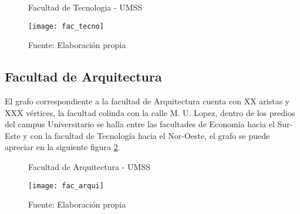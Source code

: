 \begin{figure}[H]
  \begin{center}
    \caption{Facultad de Tecnologia - UMSS}
    \label{fig:fac_tecno}
    \texttt{[image: fac\_tecno]}
    \caption*{Fuente: Elaboración propia}
  \end{center}
\end{figure}

\subsection{Facultad de Arquitectura}
\label{sub:facultad_arquitectura}

El grafo correspondiente a la facultad de Arquitectura cuenta con XX aristas y XXX vértices, la facultad colinda con la calle M. U. Lopez, dentro de los predios del campus Universitario se halla entre las facultades de Economía hacia el Sur-Este y con la facultad de Tecnología hacia el Nor-Oeste, el grafo se puede apreciar en la siguiente figura \ref{fig:fac_arqui}.

\begin{figure}[H]
  \begin{center}
    \caption{Facultad de Arquitectura - UMSS}
    \label{fig:fac_arqui}
    \texttt{[image: fac\_arqui]}
    \caption*{Fuente: Elaboración propia}
  \end{center}
\end{figure}


